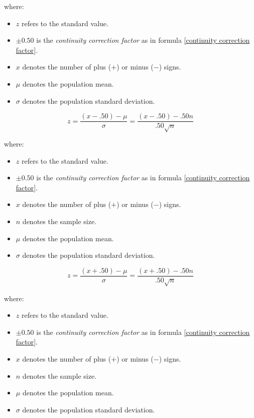where:
\begin{itemize}
 \item $z$ refers to the standard value.
 \item $\pm 0.50$ is the \emph{continuity correction factor} as in formula \eqref{continuity correction factor}.
 \item $x$ denotes the number of plus ($+$) or minus ($-$) signs. 
 \item $\mu$ denotes the population mean.
 \item $\sigma$ denotes the population standard deviation.
 \end{itemize}
\hformbar


\begin{equation}
\label{sign text n > 10 + signs more}
z = \frac{(x - .50) - \mu}{\sigma} = \frac{(x - .50) - .50n}{.50\sqrt{n}}
\end{equation}

where:
\begin{itemize}
 \item $z$ refers to the standard value.
 \item $\pm 0.50$ is the \emph{continuity correction factor} as in formula \eqref{continuity correction factor}.
 \item $x$ denotes the number of plus ($+$) or minus ($-$) signs.
 \item $n$ denotes the sample size.
 \item $\mu$ denotes the population mean.
 \item $\sigma$ denotes the population standard deviation.
 \end{itemize}
\hformbar


\begin{equation}
\label{sign text n > 10 + signs less}
z = \frac{(x + .50) - \mu}{\sigma} = \frac{(x + .50) - .50n}{.50\sqrt{n}}
\end{equation}

where:
\begin{itemize}
 \item $z$ refers to the standard value.
 \item $\pm 0.50$ is the \emph{continuity correction factor} as in formula \eqref{continuity correction factor}.
 \item $x$ denotes the number of plus ($+$) or minus ($-$) signs.
 \item $n$ denotes the sample size.
 \item $\mu$ denotes the population mean.
 \item $\sigma$ denotes the population standard deviation.
 \end{itemize}
\hformbar


